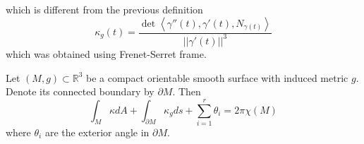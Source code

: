 \documentclass[12pt,a4paper]{article}
\theoremstyle{definition}
\theoremstyle{greenbox}
\newcommand{\R}{\mathbb{R}}
\begin{document}
    which is different from the previous definition 
    \[ \kappa_{g}(t) = \frac{\det \left< \gamma''(t), \gamma'(t), N_{\gamma(t)} \right>}{||\gamma'(t)||^{3}} \]
    which was obtained using Frenet-Serret frame.

    \begin{thm}
        Let $ (M,g)  \subset \R^{3}$ be a compact orientable smooth surface with induced metric $ g $. Denote its connected boundary  by $ \partial M $. Then 
        \[ \int_{M}\kappa dA + \int_{ \partial M} \kappa_{g}ds + \sum_{i=1}^{r} \theta_{i}  = 2 \pi \chi(M)\]
        where $ \theta_{i} $ are the exterior angle in $ \partial M $.
    \end{thm}
    
\end{document}
